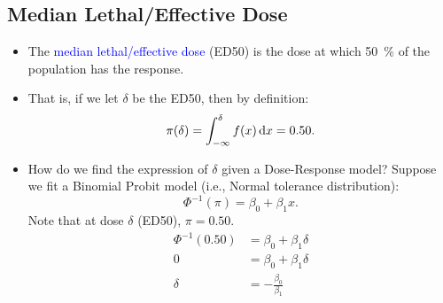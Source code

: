 \documentclass{article}\usepackage[]{graphicx}\usepackage[svgnames]{xcolor}
\begin{document}
\subsection*{Median Lethal/Effective Dose}
\begin{itemize}
      \item The \textcolor{Blue}{median lethal/effective dose} (ED50) is the dose at which \qty{50}{\percent} of the
            population has the response.
      \item That is, if we let $ \delta $ be the ED50, then by definition:
            \[ \pi(\delta)=\int_{-\infty}^{\delta}f(x)\odif{x} =0.50. \]
      \item How do we find the expression of $ \delta $ given a Dose-Response model? Suppose we fit a Binomial Probit model (i.e., Normal tolerance distribution):
            \[ \Phi^{-1}(\pi)=\beta_0+\beta_1x. \]
            Note that at dose $ \delta $ (ED50), $ \pi=0.50 $.
            \begin{align*}
                  \Phi^{-1}(0.50) & =\beta_0+\beta_1\delta    \\
                  0               & =\beta_0+\beta_1\delta    \\
                  \delta          & =-\frac{\beta_0}{\beta_1}
            \end{align*}
\end{itemize}
\end{document}
